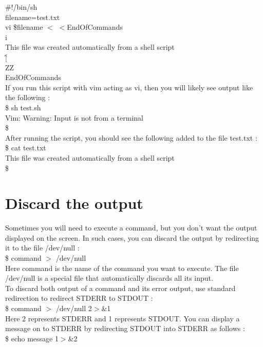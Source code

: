 \documentclass{article}
\begin{document}
\#!/bin/sh\\
filename=test.txt\\
vi \$filename $<$ $<$EndOfCommands\\
i\\
This file was created automatically from a shell script\\
\^[\\
ZZ\\
EndOfCommands\\
If you run this script with vim acting as vi, then you will likely see output like the following :\\
\$ sh test.sh\\
Vim: Warning: Input is not from a terminal\\
\$\\
After running the script, you should see the following added to the file test.txt :\\
\$ cat test.txt\\
This file was created automatically from a shell script\\
\$

\section*{Discard the output}
Sometimes you will need to execute a command, but you don't want the output displayed on the screen. In such cases, you can discard the output by redirecting it to the file /dev/null :\\
\$ command $>$ /dev/null\\
Here command is the name of the command you want to execute. The file /dev/null is a special file that automatically discards all its input.\\
To discard both output of a command and its error output, use standard redirection to redirect STDERR to STDOUT :\\
\$ command $>$ /dev/null 2$>$\&1\\
Here 2 represents STDERR and 1 represents STDOUT. You can display a message on to STDERR by redirecting STDOUT into STDERR as follows :\\
\$ echo message 1$>$\&2\\

\end{document}
